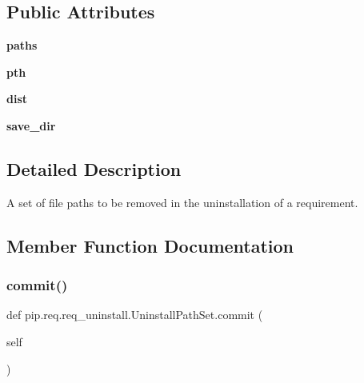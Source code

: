 \subsection*{Public Attributes}
\begin{DoxyCompactItemize}
\item 
\mbox{\label{classpip_1_1req_1_1req__uninstall_1_1_uninstall_path_set_aba2783f9a42fdb8e9cb8a963e7d7e7e8}} 
{\bfseries paths}
\item 
\mbox{\label{classpip_1_1req_1_1req__uninstall_1_1_uninstall_path_set_a0d168185491bbfaf9c90f749c5ca1883}} 
{\bfseries pth}
\item 
\mbox{\label{classpip_1_1req_1_1req__uninstall_1_1_uninstall_path_set_a5a760ee5ca2eaf0d2d36515bb4761d12}} 
{\bfseries dist}
\item 
\mbox{\label{classpip_1_1req_1_1req__uninstall_1_1_uninstall_path_set_afcc931f72c340826193ff81b940170ab}} 
{\bfseries save\+\_\+dir}
\end{DoxyCompactItemize}


\subsection{Detailed Description}
\begin{DoxyVerb}A set of file paths to be removed in the uninstallation of a
requirement.\end{DoxyVerb}
 

\subsection{Member Function Documentation}
\mbox{\label{classpip_1_1req_1_1req__uninstall_1_1_uninstall_path_set_a73103147982dceec014e66072c4cf611}} 
\subsubsection{\texorpdfstring{commit()}{commit()}}
{\footnotesize\ttfamily def pip.\+req.\+req\+\_\+uninstall.\+Uninstall\+Path\+Set.\+commit (\begin{DoxyParamCaption}\item[{}]{self }\end{DoxyParamCaption})}

